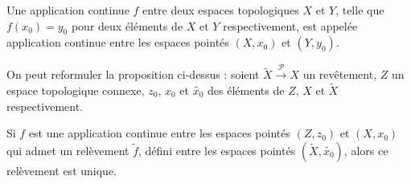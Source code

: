 \begin{rema}
Une application continue $f$ entre deux espaces topologiques $X$ et $Y$, telle que $f(x_0)=y_0$ %
pour deux \'el\'ements de $X$ et $Y$ respectivement, est appel\'ee application continue entre les espaces point\'es $(X,x_0)$ et $(Y,y_0)$.

\par
On peut reformuler la proposition ci-dessus : %
soient $\tilde{X}\overset{\mathcal{P}}{\longrightarrow} X$ un rev\^etement, $Z$ un espace topologique connexe, %
$z_0$, $x_0$ et $\tilde{x_0}$ des \'el\'ements de $Z$, $X$ et $\tilde{X}$ respectivement.

\par
Si $f$ est une application continue entre les espaces point\'es $(Z,z_0)$ et $(X,x_0)$ qui admet un rel\`evement $\tilde{f}$, %
d\'efini entre les espaces point\'es $(\tilde{X},\tilde{x_0})$, alors ce rel\`evement est unique.
\end{rema}

